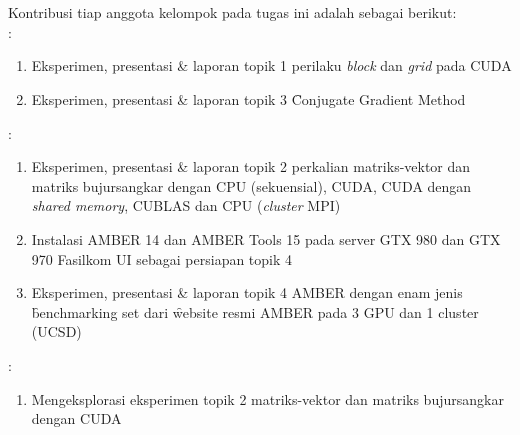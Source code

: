 \chapter{\kontribusi}
Kontribusi tiap anggota kelompok pada tugas ini adalah sebagai berikut: \\[8pt]

:
\begin{enumerate}
	\item Eksperimen, presentasi \& laporan topik 1 perilaku \textit{block} dan \textit{grid} pada CUDA
	\item Eksperimen, presentasi \& laporan topik 3 \f{Conjugate Gradient Method}
\end{enumerate}

:
\begin{enumerate}	
	\item Eksperimen, presentasi \& laporan topik 2 perkalian matriks-vektor dan matriks bujursangkar dengan CPU (sekuensial), CUDA, CUDA dengan \textit{shared memory}, CUBLAS dan CPU (\textit{cluster} MPI)
	\item Instalasi AMBER 14 dan AMBER Tools 15 pada server GTX 980 dan GTX 970 Fasilkom UI sebagai persiapan topik 4
	\item Eksperimen, presentasi \& laporan topik 4 AMBER dengan enam jenis \f{benchmarking set} dari \f{website} resmi AMBER pada 3 GPU dan 1 cluster (UCSD)
\end{enumerate}

:
\begin{enumerate}
	\item Mengeksplorasi eksperimen topik 2 matriks-vektor dan matriks bujursangkar dengan CUDA
\end{enumerate}
